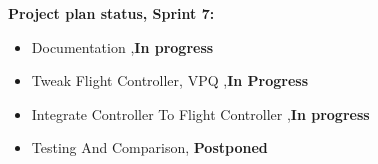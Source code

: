 \textbf{Project plan status, Sprint 7:}
\begin{itemize}
        \item Documentation ,\textbf{In progress}
        \item Tweak Flight Controller, VPQ ,\textbf{In Progress}
        \item Integrate Controller To Flight Controller ,\textbf{In progress}
        \item Testing And Comparison, \textbf{Postponed}
    \end{itemize}



